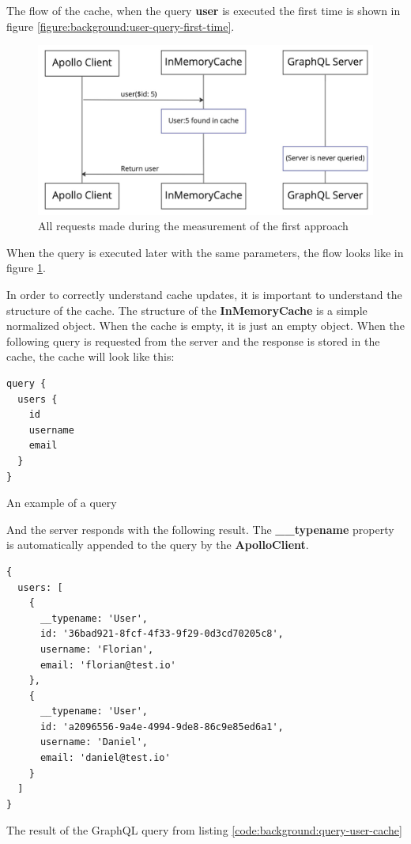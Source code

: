 The flow of the cache, when the query \textbf{user} is executed the first time is shown in figure \ref{figure:background:user-query-first-time}.


\ifshowImages
\begin{figure}[!htbp]
\centering
\includegraphics[width=0.6\linewidth]{images/background/apollo/apollo-client-basic-cache-warm.jpeg}
\caption{All requests made during the measurement of the first approach}\label{figure:background:user-query-second-time}
\end{figure}
\fi

When the query is executed later with the same parameters, the flow looks like in figure \ref{figure:background:user-query-second-time}.

In order to correctly understand cache updates, it is important to understand the structure of the cache. The structure of the \textbf{InMemoryCache} is a simple normalized object. When the cache is empty, it is just an empty object. When the following query is requested from the server and the response is stored in the cache, the cache will look like this:

\ifshowListings
\begin{listing}[H]
\begin{verbatim}
query {
  users {
    id
    username
    email
  }
}
\end{verbatim}
\caption{An example of a query}\label{code:background:query-user-cache}
\end{listing}
\fi

And the server responds with the following result. The \textbf{\_\_typename} property is automatically appended to the query by the \textbf{ApolloClient}.

\ifshowListings
\begin{listing}[H]
\begin{verbatim}
{
  users: [
    {
      __typename: 'User',
      id: '36bad921-8fcf-4f33-9f29-0d3cd70205c8',
      username: 'Florian',
      email: 'florian@test.io'
    }, 
    {
      __typename: 'User',
      id: 'a2096556-9a4e-4994-9de8-86c9e85ed6a1',
      username: 'Daniel',
      email: 'daniel@test.io'
    }
  ]
}
\end{verbatim}
\caption{The result of the GraphQL query from listing \ref{code:background:query-user-cache}}\label{code:background:query-user-response-result}
\end{listing}
\fi

